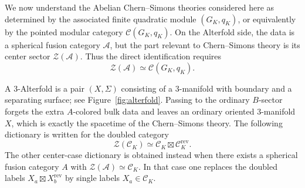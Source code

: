 \documentclass[12pt]{amsart}
\numberwithin{equation}{section}
\theoremstyle{definition}
\begin{document}
We now understand the Abelian Chern--Simons theories considered here as determined by the associated finite quadratic module $(G_K,q_K)$, or equivalently by the pointed modular category $\mathcal C(G_K,q_K)$.  On the Alterfold side, the data is a spherical fusion category $\mathcal A$, but the part relevant to Chern--Simons theory is its center sector $\mathcal Z(\mathcal A)$. Thus the direct identification requires
$$
\mathcal Z(\mathcal A)\simeq \mathcal C(G_K,q_K).
$$

A $3$-Alterfold is a pair $(X,\Sigma)$ consisting of a $3$-manifold with boundary and a separating surface; see Figure~\ref{fig:alterfold}. Passing to the ordinary $B$-sector forgets the extra $A$-colored bulk data and leaves an ordinary oriented $3$-manifold $X$, which is exactly the spacetime of the Chern--Simons theory.  The following dictionary is written for the doubled category $$ \mathcal Z(\mathcal C_K)\simeq \mathcal C_K\boxtimes \mathcal C_K^{\mathrm{rev}}. $$ The other center-case dictionary is obtained instead when there exists a spherical fusion category $A$ with $\mathcal Z(\mathcal A)\simeq \mathcal C_K.$ In that case one replaces the doubled labels $ X_a\boxtimes X_b^{\mathrm{rev}}$ by single labels $ X_a\in \mathcal C_K.$
\end{document}
